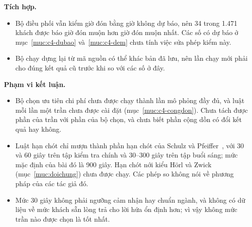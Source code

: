 \textbf{Tích hợp.}
\begin{itemize}[leftmargin=1.2cm,itemsep=2pt,topsep=3pt]
\item Bộ điều phối vẫn kiểm giờ đón bằng giờ không dự báo, nên 34 trong 1.471 khách được báo giờ đón muộn hơn giờ đón
muộn nhất. Các số có dự báo ở mục~\ref{muc:c4-dubao} và~\ref{muc:c4-dem} chưa tính việc sửa phép kiểm này.
\item Bộ chạy dựng lại từ mã nguồn có thể khác bản đã lưu, nên lần chạy mới phải cho đúng kết quả cũ trước khi so với
các số ở đây.
\end{itemize}

\textbf{Phạm vi kết luận.}
\begin{itemize}[leftmargin=1.2cm,itemsep=2pt,topsep=3pt]
\item Bộ chọn ưu tiên chi phí chưa được chạy thành lần mô phỏng đầy đủ, và luật mỗi lần một trần chưa được cài đặt
(mục~\ref{muc:c4-congdon}). Chưa tách được phần của trần với phần của bộ chọn, và chưa biết phần cộng dồn có đổi kết quả
hay không.
\item Luật hạn chót chỉ mượn thành phần hạn chót của Schulz và Pfeiffer~\cite{schulz2026}, với 30 và 60 giây trên tập
kiểm tra chính và 30--300 giây trên tập buổi sáng; mức mặc định của bài đó là 900 giây. Hạn chót nới kiểu Hörl và
Zwick~\cite{horl2022} (mục~\ref{muc:doichung}) chưa được chạy. Các phép so không nói về phương pháp của các tác giả đó.
\item Mức 30 giây không phải ngưỡng cảm nhận hay chuẩn ngành, và không có dữ liệu về mức khách sẵn lòng trả cho lời
hứa ổn định hơn; vì vậy không mức trần nào được chọn là tốt nhất.
\end{itemize}
